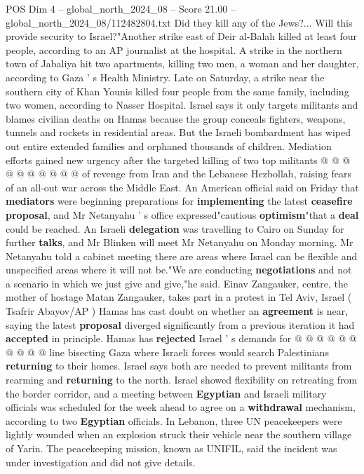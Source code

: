 \begin{textsample}{POS Dim 4 – global\_north\_2024\_08 – Score 21.00 – global\_north\_2024\_08/112482804.txt}
Did they kill any of the Jews?...
Will this provide security to Israel?"Another strike east of Deir al-Balah killed at least four people, according to an AP journalist at the hospital.
A strike in the northern town of Jabaliya hit two apartments, killing two men, a woman and her daughter, according to Gaza ' s Health Ministry.
Late on Saturday, a strike near the southern city of Khan Younis killed four people from the same family, including two women, according to Nasser Hospital.
Israel says it only targets militants and blames civilian deaths on Hamas because the group conceals fighters, weapons, tunnels and rockets in residential areas.
But the Israeli bombardment has wiped out entire extended families and orphaned thousands of children.
Mediation efforts gained new urgency after the targeted killing of two top militants @ @ @ @ @ @ @ @ @ @ of revenge from Iran and the Lebanese Hezbollah, raising fears of an all-out war across the Middle East.
An American official said on Friday that \textbf{mediators} were beginning preparations for \textbf{implementing} the latest \textbf{ceasefire} \textbf{proposal}, and Mr Netanyahu ' s office expressed"cautious \textbf{optimism}"that a \textbf{deal} could be reached.
An Israeli \textbf{delegation} was travelling to Cairo on Sunday for further \textbf{talks}, and Mr Blinken will meet Mr Netanyahu on Monday morning.
Mr Netanyahu told a cabinet meeting there are areas where Israel can be flexible and unspecified areas where it will not be."We are conducting \textbf{negotiations} and not a scenario in which we just give and give,"he said.
Einav Zangauker, centre, the mother of hostage Matan Zangauker, takes part in a protest in Tel Aviv, Israel ( Tsafrir Abayov/AP ) Hamas has cast doubt on whether an \textbf{agreement} is near, saying the latest \textbf{proposal} diverged significantly from a previous iteration it had \textbf{accepted} in principle.
Hamas has \textbf{rejected} Israel ' s demands for @ @ @ @ @ @ @ @ @ @ line bisecting Gaza where Israeli forces would search Palestinians \textbf{returning} to their homes.
Israel says both are needed to prevent militants from rearming and \textbf{returning} to the north.
Israel showed flexibility on retreating from the border corridor, and a meeting between \textbf{Egyptian} and Israeli military officials was scheduled for the week ahead to agree on a \textbf{withdrawal} mechanism, according to two \textbf{Egyptian} officials.
In Lebanon, three UN peacekeepers were lightly wounded when an explosion struck their vehicle near the southern village of Yarin.
The peacekeeping mission, known as UNIFIL, said the incident was under investigation and did not give details.

\end{textsample}
